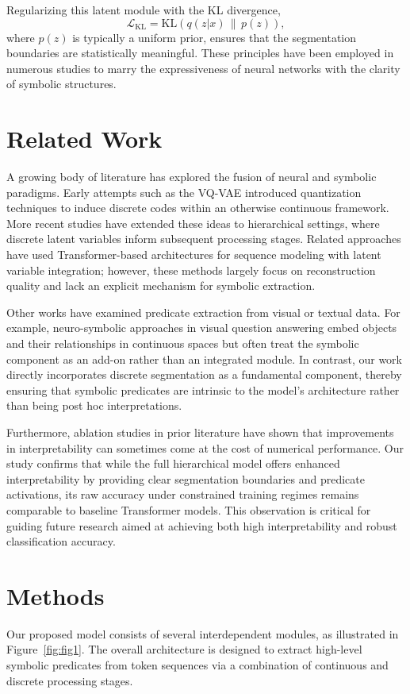 \documentclass{article}
\begin{document}
Regularizing this latent module with the KL divergence,
\[
\mathcal{L}_{\text{KL}} = \mathrm{KL}\left(q(z|x) \,\|\, p(z)\right),
\]
where $p(z)$ is typically a uniform prior, ensures that the segmentation boundaries are statistically meaningful. These principles have been employed in numerous studies to marry the expressiveness of neural networks with the clarity of symbolic structures.

\section{Related Work}
A growing body of literature has explored the fusion of neural and symbolic paradigms. Early attempts such as the VQ-VAE introduced quantization techniques to induce discrete codes within an otherwise continuous framework. More recent studies have extended these ideas to hierarchical settings, where discrete latent variables inform subsequent processing stages. Related approaches have used Transformer-based architectures for sequence modeling with latent variable integration; however, these methods largely focus on reconstruction quality and lack an explicit mechanism for symbolic extraction.

Other works have examined predicate extraction from visual or textual data. For example, neuro-symbolic approaches in visual question answering embed objects and their relationships in continuous spaces but often treat the symbolic component as an add-on rather than an integrated module. In contrast, our work directly incorporates discrete segmentation as a fundamental component, thereby ensuring that symbolic predicates are intrinsic to the model’s architecture rather than being post hoc interpretations.

Furthermore, ablation studies in prior literature have shown that improvements in interpretability can sometimes come at the cost of numerical performance. Our study confirms that while the full hierarchical model offers enhanced interpretability by providing clear segmentation boundaries and predicate activations, its raw accuracy under constrained training regimes remains comparable to baseline Transformer models. This observation is critical for guiding future research aimed at achieving both high interpretability and robust classification accuracy.

\section{Methods}
Our proposed model consists of several interdependent modules, as illustrated in Figure~\ref{fig:fig1}. The overall architecture is designed to extract high-level symbolic predicates from token sequences via a combination of continuous and discrete processing stages.
\end{document}
